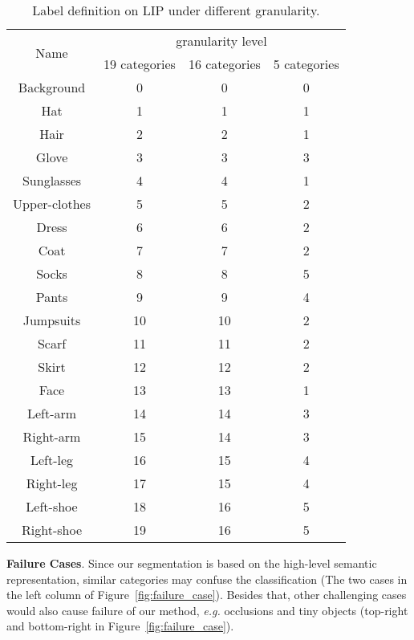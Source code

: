 \documentclass[runningheads]{llncs}
\def\eg{\emph{e.g. }}
\newcommand{\PAR}[1]{\smallskip \noindent \textbf{#1}}
\newcommand{\figref}[1]{Figure~\ref{#1}}
\begin{document}
\begin{table}[H]
    \centering 
    \small
    \caption{Label definition on LIP under different granularity.\label{tab:LIP_difinitions}}
    \begin{tabular}{c|ccc}
        \toprule
        \multirow{2}{*}{Name} & \multicolumn{3}{c}{granularity level}\tabularnewline
        & {19 categories} & {16 categories} & {5 categories} \tabularnewline
        \midrule
        Background & 0 & 0 & 0 \tabularnewline
        Hat & 1 & 1 & 1 \tabularnewline
        Hair & 2 & 2 & 1 \tabularnewline
        Glove & 3 & 3 & 3 \tabularnewline
        Sunglasses & 4 & 4 & 1 \tabularnewline
        Upper-clothes & 5 & 5 & 2 \tabularnewline
        Dress & 6 & 6 & 2 \tabularnewline
        Coat & 7 & 7 & 2 \tabularnewline
        Socks & 8 & 8 & 5 \tabularnewline
        Pants & 9 & 9 & 4 \tabularnewline
        Jumpsuits & 10 & 10 & 2 \tabularnewline
        Scarf & 11 & 11 & 2 \tabularnewline
        Skirt & 12 & 12 & 2 \tabularnewline
        Face & 13 & 13 & 1 \tabularnewline
        Left-arm & 14 & 14 & 3 \tabularnewline
        Right-arm & 15 & 14 & 3 \tabularnewline
        Left-leg & 16 & 15 & 4 \tabularnewline
        Right-leg & 17 & 15 & 4 \tabularnewline
        Left-shoe & 18 & 16 & 5 \tabularnewline
        Right-shoe & 19 & 16 & 5 \tabularnewline
        \bottomrule
    \end{tabular}
\end{table}



\PAR{Failure Cases}. Since our segmentation is based on the high-level semantic representation,  similar categories may confuse the classification (The two cases in the left column of \figref{fig:failure_case}). Besides that, other challenging cases would also cause failure of our method, \eg occlusions and tiny objects (top-right and bottom-right in \figref{fig:failure_case}). 
\end{document}
